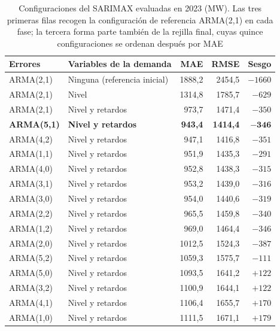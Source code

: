 \begin{table}[H]
	\centering
	\caption{Configuraciones del SARIMAX evaluadas en 2023 (MW). Las tres primeras filas recogen la configuración de referencia ARMA(2,1) en cada fase; la tercera forma parte también de la rejilla final, cuyas quince configuraciones se ordenan después por MAE}
	\label{tab:sarimax-rejilla}
	\small
	\begin{tabular}{llrrr}
		\hline
		\textbf{Errores} & \textbf{Variables de la demanda} & \textbf{MAE} & \textbf{RMSE} & \textbf{Sesgo} \\
		\hline
		ARMA(2,1) & Ninguna (referencia inicial) & 1888,2 & 2454,5 & $-1660$ \\
		ARMA(2,1) & Nivel & 1314,8 & 1785,7 & $-629$ \\
		ARMA(2,1) & Nivel y retardos & 973,7 & 1471,4 & $-350$ \\
		\hline
		\textbf{ARMA(5,1)} & \textbf{Nivel y retardos} & \textbf{943,4} & \textbf{1414,4} & $\mathbf{-346}$ \\
		ARMA(4,2) & Nivel y retardos & 947,1 & 1416,8 & $-351$ \\
		ARMA(1,1) & Nivel y retardos & 951,9 & 1435,3 & $-291$ \\
		ARMA(4,0) & Nivel y retardos & 952,8 & 1438,3 & $-315$ \\
		ARMA(3,1) & Nivel y retardos & 953,2 & 1439,0 & $-316$ \\
		ARMA(3,0) & Nivel y retardos & 954,0 & 1440,6 & $-319$ \\
		ARMA(2,2) & Nivel y retardos & 965,5 & 1459,8 & $-340$ \\
		ARMA(1,2) & Nivel y retardos & 969,0 & 1464,4 & $-346$ \\
		ARMA(2,0) & Nivel y retardos & 1012,5 & 1524,3 & $-387$ \\
		ARMA(5,2) & Nivel y retardos & 1059,3 & 1575,7 & $-111$ \\
		ARMA(5,0) & Nivel y retardos & 1093,5 & 1641,2 & $+122$ \\
		ARMA(3,2) & Nivel y retardos & 1100,9 & 1644,1 & $+122$ \\
		ARMA(4,1) & Nivel y retardos & 1106,4 & 1655,7 & $+170$ \\
		ARMA(1,0) & Nivel y retardos & 1111,5 & 1671,1 & $+179$ \\
		\hline
	\end{tabular}
\end{table}

